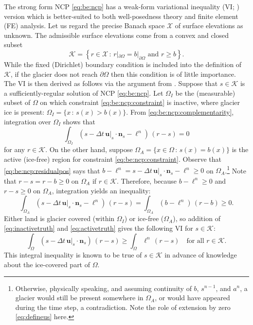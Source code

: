 \documentclass[hidelinks,onefignum,onetabnum,final]{siamart220329}  %
\newcommand{\bn}{\mathbf{n}}
\newcommand{\bu}{\mathbf{u}}
\newcommand{\cK}{\mathcal{K}}
\newcommand{\cX}{\mathcal{X}}
\begin{document}
The strong form NCP \eqref{eq:be:ncp} has a weak-form variational inequality (VI; \cite{Evans2010,KinderlehrerStampacchia1980}) version which is better-suited to both well-posedness theory and finite element (FE) analysis.  Let us regard the precise Banach space $\cX$ of surface elevations as unknown.  The admissible surface elevations come from a convex and closed subset
\begin{equation}
\cK = \left\{r \in\cX\,:\,r|_{\partial\Omega}=b|_{\partial\Omega} \text{ and } r \ge b\right\}.  \label{eq:be:admissible}
\end{equation}
While the fixed (Dirichlet) boundary condition is included into the definition of $\cK$, if the glacier does not reach $\partial\Omega$ then this condition is of little importance.  The VI is then derived as follows via the argument from \cite{Bueler2021conservation}.  Suppose that $s \in \cK$ is a sufficiently-regular solution of NCP \eqref{eq:be:ncp}.  Let $\Omega_I$ be the (measurable) subset of $\Omega$ on which constraint \eqref{eq:be:ncp:constraint} is inactive, where glacier ice is present: $\Omega_I = \{x\,:\,s(x)>b(x)\}$.  From \eqref{eq:be:ncp:complementarity}, integration over $\Omega_I$ shows that
\begin{equation}
\int_{\Omega_I} \left(s - \Delta t\,\bu|_s \cdot \bn_s - \ell^n\right)\,(r-s) = 0  \label{eq:inactivetruth}
\end{equation}
for any $r\in\cK$.  On the other hand, suppose $\Omega_A = \{x \in \Omega \,:\,s(x)=b(x)\}$ is the active (ice-free) region for constraint \eqref{eq:be:ncp:constraint}.  Observe that \eqref{eq:be:ncp:residualpos} says that $b-\ell^n = s - \Delta t\,\bu|_s \cdot \bn_s - \ell^n \ge 0$ on $\Omega_A$.\footnote{Otherwise, physically speaking, and assuming continuity of $b$, $s^{n-1}$, and $a^n$, a glacier would still be present somewhere in $\Omega_A$, or would have appeared during the time step, a contradiction.  Note the role of extension by zero \eqref{eq:defineus} here.}  Note that $r-s=r-b\ge 0$ on $\Omega_A$ if $r\in\cK$.  Therefore, because $b-\ell^n \ge 0$ and $r-s\ge 0$ on $\Omega_A$, integration yields an inequality:
\begin{equation}
\int_{\Omega_A} \left(s - \Delta t\,\bu|_s \cdot \bn_s - \ell^n\right)\,(r-s) = \int_{\Omega_A} \left(b - \ell^n\right)\,(r-b) \ge 0.  \label{eq:activetruth}
\end{equation}
Either land is glacier covered (within $\Omega_I$) or ice-free ($\Omega_A$), so addition of \eqref{eq:inactivetruth} and \eqref{eq:activetruth} gives the following VI for $s \in \cK$:
\begin{equation}
\int_\Omega \left(s - \Delta t\,\bu|_s \cdot \bn_s\right)\,(r-s) \ge \int_\Omega \ell^n \,(r-s) \quad \text{for all } r \in \cK. \label{eq:be:viearly}
\end{equation}
This integral inequality is known to be true of $s\in\cK$ in advance of knowledge about the ice-covered part of $\Omega$.
	
\end{document}
